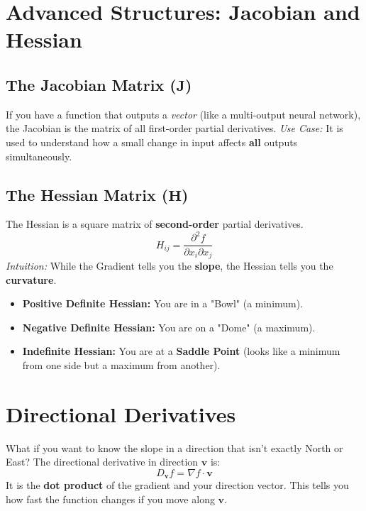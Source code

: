 \documentclass{article}
\begin{document}
\section{Advanced Structures: Jacobian and Hessian}

\subsection{The Jacobian Matrix ($\mathbf{J}$)}
If you have a function that outputs a \textit{vector} (like a multi-output neural network), the Jacobian is the matrix of all first-order partial derivatives.
\textit{Use Case:} It is used to understand how a small change in input affects \textbf{all} outputs simultaneously.

\subsection{The Hessian Matrix ($\mathbf{H}$)}
The Hessian is a square matrix of \textbf{second-order} partial derivatives.
\begin{equation}
    H_{ij} = \frac{\partial^2 f}{\partial x_i \partial x_j}
\end{equation}
\textit{Intuition:} While the Gradient tells you the \textbf{slope}, the Hessian tells you the \textbf{curvature}.
\begin{itemize}
    \item \textbf{Positive Definite Hessian:} You are in a "Bowl" (a minimum).
    \item \textbf{Negative Definite Hessian:} You are on a "Dome" (a maximum).
    \item \textbf{Indefinite Hessian:} You are at a \textbf{Saddle Point} (looks like a minimum from one side but a maximum from another).
\end{itemize}

\section{Directional Derivatives}
What if you want to know the slope in a direction that isn't exactly North or East? 
The directional derivative in direction $\mathbf{v}$ is:
\begin{equation}
    D_{\mathbf{v}}f = \nabla f \cdot \mathbf{v}
\end{equation}
It is the \textbf{dot product} of the gradient and your direction vector. This tells you how fast the function changes if you move along $\mathbf{v}$.
\end{document}
